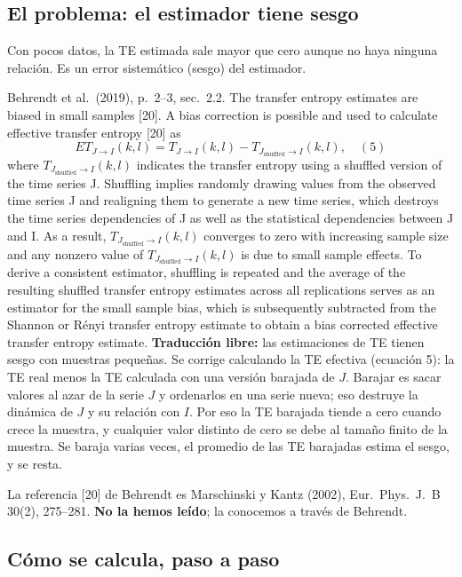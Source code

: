 \documentclass[11pt,openany]{book}
\begin{document}
\subsection*{El problema: el estimador tiene sesgo}

Con pocos datos, la TE estimada sale mayor que cero aunque no haya ninguna relación. Es un error sistemático (sesgo) del estimador.

\begin{cita}{Behrendt et al.\ (2019), p.~2--3, sec.~2.2.}
The transfer entropy estimates are biased in small samples [20]. A bias correction is possible and used to calculate effective transfer entropy [20] as
\[ ET_{J\to I}(k,l) = T_{J\to I}(k,l) - T_{J_{\text{shuffled}}\to I}(k,l), \quad (5) \]
where $T_{J_{\text{shuffled}}\to I}(k,l)$ indicates the transfer entropy using a shuffled version of the time series J. Shuffling implies randomly drawing values from the observed time series J and realigning them to generate a new time series, which destroys the time series dependencies of J as well as the statistical dependencies between J and I. As a result, $T_{J_{\text{shuffled}}\to I}(k,l)$ converges to zero with increasing sample size and any nonzero value of $T_{J_{\text{shuffled}}\to I}(k,l)$ is due to small sample effects. To derive a consistent estimator, shuffling is repeated and the average of the resulting shuffled transfer entropy estimates across all replications serves as an estimator for the small sample bias, which is subsequently subtracted from the Shannon or Rényi transfer entropy estimate to obtain a bias corrected effective transfer entropy estimate.
\tcblower
\textbf{Traducción libre:} las estimaciones de TE tienen sesgo con muestras pequeñas. Se corrige calculando la TE efectiva (ecuación 5): la TE real menos la TE calculada con una versión barajada de $J$. Barajar es sacar valores al azar de la serie $J$ y ordenarlos en una serie nueva; eso destruye la dinámica de $J$ y su relación con $I$. Por eso la TE barajada tiende a cero cuando crece la muestra, y cualquier valor distinto de cero se debe al tamaño finito de la muestra. Se baraja varias veces, el promedio de las TE barajadas estima el sesgo, y se resta.
\end{cita}

La referencia [20] de Behrendt es Marschinski y Kantz (2002), Eur.\ Phys.\ J.\ B 30(2), 275--281. \textbf{No la hemos leído}; la conocemos a través de Behrendt.

\subsection*{Cómo se calcula, paso a paso}
\end{document}
